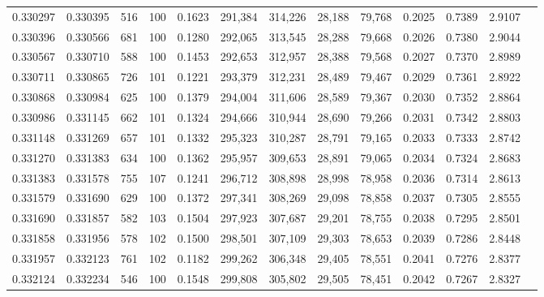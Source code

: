 \begin{tabular}{rrrrrrrrrrrrr}
0.330297 & 0.330395 &   516 & 100 &                                     0.1623 & 291,384 & 314,226 &  28,188 &  79,768 & 0.2025 & 0.7389 & 2.9107 \\
0.330396 & 0.330566 &   681 & 100 &                                     0.1280 & 292,065 & 313,545 &  28,288 &  79,668 & 0.2026 & 0.7380 & 2.9044 \\
0.330567 & 0.330710 &   588 & 100 &                                     0.1453 & 292,653 & 312,957 &  28,388 &  79,568 & 0.2027 & 0.7370 & 2.8989 \\
0.330711 & 0.330865 &   726 & 101 &                                     0.1221 & 293,379 & 312,231 &  28,489 &  79,467 & 0.2029 & 0.7361 & 2.8922 \\
0.330868 & 0.330984 &   625 & 100 &                                     0.1379 & 294,004 & 311,606 &  28,589 &  79,367 & 0.2030 & 0.7352 & 2.8864 \\
0.330986 & 0.331145 &   662 & 101 &                                     0.1324 & 294,666 & 310,944 &  28,690 &  79,266 & 0.2031 & 0.7342 & 2.8803 \\
0.331148 & 0.331269 &   657 & 101 &                                     0.1332 & 295,323 & 310,287 &  28,791 &  79,165 & 0.2033 & 0.7333 & 2.8742 \\
0.331270 & 0.331383 &   634 & 100 &                                     0.1362 & 295,957 & 309,653 &  28,891 &  79,065 & 0.2034 & 0.7324 & 2.8683 \\
0.331383 & 0.331578 &   755 & 107 &                                     0.1241 & 296,712 & 308,898 &  28,998 &  78,958 & 0.2036 & 0.7314 & 2.8613 \\
0.331579 & 0.331690 &   629 & 100 &                                     0.1372 & 297,341 & 308,269 &  29,098 &  78,858 & 0.2037 & 0.7305 & 2.8555 \\
0.331690 & 0.331857 &   582 & 103 &                                     0.1504 & 297,923 & 307,687 &  29,201 &  78,755 & 0.2038 & 0.7295 & 2.8501 \\
0.331858 & 0.331956 &   578 & 102 &                                     0.1500 & 298,501 & 307,109 &  29,303 &  78,653 & 0.2039 & 0.7286 & 2.8448 \\
0.331957 & 0.332123 &   761 & 102 &                                     0.1182 & 299,262 & 306,348 &  29,405 &  78,551 & 0.2041 & 0.7276 & 2.8377 \\
0.332124 & 0.332234 &   546 & 100 &                                     0.1548 & 299,808 & 305,802 &  29,505 &  78,451 & 0.2042 & 0.7267 & 2.8327 \\

\end{tabular}
